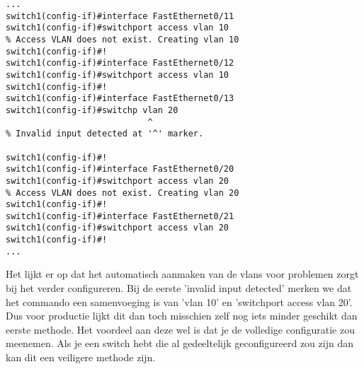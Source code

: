 \begin{center}
\begin{Verbatim}
...
switch1(config-if)#interface FastEthernet0/11
switch1(config-if)#switchport access vlan 10
% Access VLAN does not exist. Creating vlan 10
switch1(config-if)#!
switch1(config-if)#interface FastEthernet0/12
switch1(config-if)#switchport access vlan 10
switch1(config-if)#!
switch1(config-if)#interface FastEthernet0/13
switch1(config-if)#switchp vlan 20
                            ^
% Invalid input detected at '^' marker.

switch1(config-if)#!
switch1(config-if)#interface FastEthernet0/20
switch1(config-if)#switchport access vlan 20
% Access VLAN does not exist. Creating vlan 20
switch1(config-if)#!
switch1(config-if)#interface FastEthernet0/21
switch1(config-if)#switchport access vlan 20
switch1(config-if)#!
...
\end{Verbatim}
\end{center}

Het lijkt er op dat het automatisch aanmaken van de vlans voor problemen zorgt bij het verder configureren. Bij de eerste 'invalid input detected' merken we dat het commando een samenvoeging is van 'vlan 10' en 'switchport access vlan 20'. Dus voor productie lijkt dit dan toch misschien zelf nog iets minder geschikt dan eerste methode. Het voordeel aan deze wel is dat je de volledige configuratie zou meenemen. Als je een switch hebt die al gedeeltelijk geconfigureerd zou zijn dan kan dit een veiligere methode zijn.